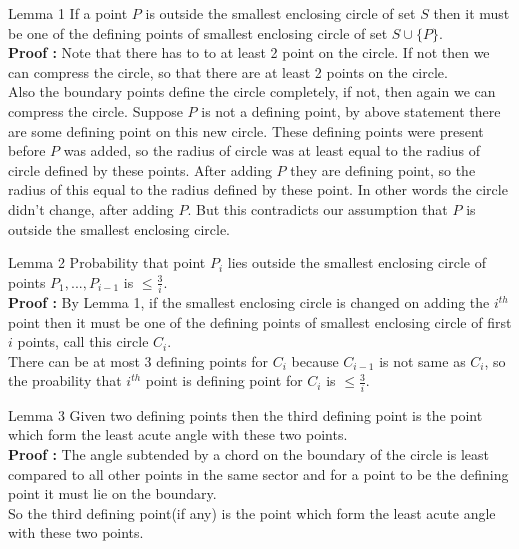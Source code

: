 \documentclass{beamer}
\begin{document}
\begin{frame}{Lemma 1}
If a point $P$ is outside the smallest enclosing circle of set $S$ then it must be one of the defining points of smallest enclosing circle of set $S\cup \{P\}$.
\pause
\\
\textbf{Proof : } Note that there has to to at least 2 point on the circle. If not then we can compress the circle, so that there are at least 2 points on the circle.\\
\pause
Also the boundary points define the circle completely, if not, then again we can compress the circle. Suppose $P$ is not a defining point, by above statement there are some defining point on this new circle. These defining points were present before $P$ was added, so the radius of circle was at least equal to the radius of circle defined by these points. After adding $P$ they are defining point, so the radius of this equal to the radius defined by these point. In other words the circle didn't change, after adding $P$. But this contradicts our assumption that $P$ is outside the smallest enclosing circle.
\end{frame}

\begin{frame}{Lemma 2}
Probability that point $P_i$ lies outside the smallest enclosing circle of points $P_1, ... , P_{i-1}$ is $\leq \frac{3}{i}$.
\pause
\\
\textbf{Proof : } By Lemma 1, if the smallest enclosing circle is changed on adding the $i^{th}$ point then it must be one of the defining points of smallest enclosing circle of first $i$ points, call this circle $C_i$.
\\
\pause
There can be at most $3$ defining points for $C_i$ because $C_{i-1}$ is not same as $C_i$, so the proability that $i^{th}$ point is defining point for $C_i$ is $\leq \frac{3}{i}$.

\end{frame}
\begin{frame}{Lemma 3}
 Given two defining points then the third defining point is the point which form the least acute angle with these two points.
\pause
\\
\textbf{Proof : } The angle subtended by a chord on the boundary of the circle is least compared to all other points in the same sector and for a point to be the defining point it must lie on the boundary.
\\
\pause
So the third defining point(if any) is the point which form the least acute angle with these two points.    
\end{frame}
\end{document}

